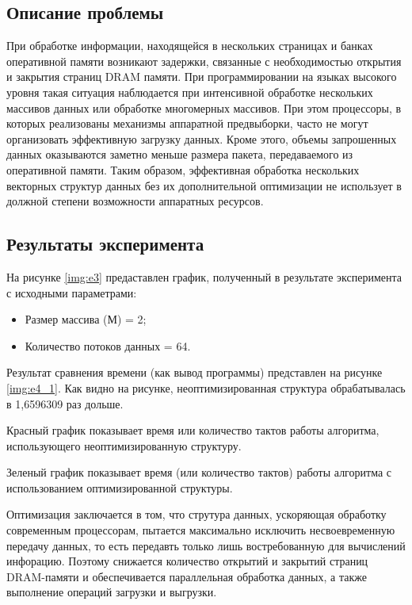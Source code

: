 \subsection*{Описание проблемы}
При обработке информации, находящейся в нескольких страницах и банках оперативной памяти возникают задержки, связанные с необходимостью открытия и закрытия страниц DRAM памяти. При программировании на языках высокого уровня такая ситуация наблюдается при интенсивной обработке нескольких массивов данных или обработке многомерных массивов. При этом процессоры, в которых реализованы механизмы аппаратной предвыборки, часто не могут организовать эффективную загрузку данных. Кроме этого, объемы запрошенных данных оказываются заметно меньше размера пакета, передаваемого из оперативной памяти. Таким образом, эффективная обработка нескольких векторных структур данных без их дополнительной оптимизации не использует в должной степени возможности аппаратных ресурсов. 

\subsection*{Результаты эксперимента}
На рисунке \ref{img:e3} предаставлен график, полученный в результате эксперимента с исходными параметрами:
\begin{itemize}
	\item Размер массива (М) = 2;
	\item Количество потоков данных = 64.
\end{itemize}


Результат сравнения времени (как вывод программы) представлен на рисунке \ref{img:e4_1}. Как видно на рисунке, неоптимизированная структура обрабатывалась в 1,6596309 раз дольше.


Красный график показывает время или количество тактов работы алгоритма, использующего неоптимизированную структуру.

Зеленый график показывает время (или количество тактов) работы алгоритма с использованием оптимизированной структуры.

Оптимизация заключается в том, что струтура данных, ускоряющая обработку современным процессорам, пытается максимально исключить несвоевременную передачу данных, то есть передавть только лишь востребованную для вычислений инфорацию. Поэтому снижается количество открытий и закрытий страниц DRAM-памяти и обеспечивается параллельная обработка данных, а также выполнение операций загрузки и выгрузки.


